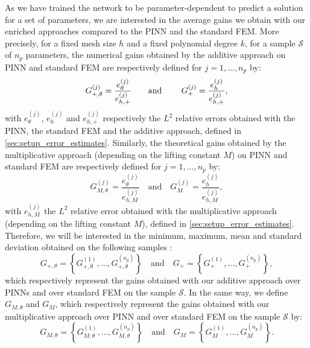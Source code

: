 As we have trained the network to be parameter-dependent to predict a solution for a set of parameters, we are interested in the average gains we obtain with our enriched approaches compared to the PINN and the standard FEM. More precisely, for a fixed mesh size $h$ and a fixed polynomial degree $k$, for a sample $\mathcal{S}$ of $n_p$ parameters, the numerical gains obtained by the additive approach on PINN and standard FEM are respectively defined for $j=1,\dots,n_p$ by:
\begin{equation}
	G_{+,\theta}^{(j)}=\frac{e_\theta^{(j)}}{e_{h,+}^{(j)}}
    \text{\qquad and \qquad}
    G_+^{(j)}=\frac{e_h^{(j)}}{e_{h,+}^{(j)}}, \label{eq:gain_j}
\end{equation}
with $e_\theta^{(j)}$, $e_h^{(j)}$ and $e_{h,+}^{(j)}$ respectively the $L^2$ relative errors obtained with the PINN, the standard FEM and the additive approach, defined in \cref{sec:setup_error_estimates}.
Similarly, the theoretical gains obtained by the multiplicative approach (depending on the lifting constant $M$) on PINN and standard FEM are respectively defined for $j=1,\dots,n_p$ by:
\begin{equation}
	G_{M,\theta}^{(j)}=\frac{e_\theta^{(j)}}{e_{h,M}^{(j)}} \quad \text{and} \quad G_M^{(j)}=\frac{e_h^{(j)}}{e_{h,M}^{(j)}}, \label{eq:gain_j_mul}
\end{equation}
with $e_{h,M}^{(j)}$ the $L^2$ relative error obtained with the multiplicative approach (depending on the lifting constant $M$), defined in \cref{sec:setup_error_estimates}.
Therefore, we will be interested in the minimum, maximum, mean and standard deviation obtained on the following samples :
\begin{equation}
	G_{+,\theta}=\left\{G_{+,\theta}^{(1)},\dots,G_{+,\theta}^{(n_p)}\right\} \quad \text{and} \quad G_+=\left\{G_+^{(1)},\dots,G_+^{(n_p)}\right\}, \label{eq:gain_add_num}
\end{equation}
which respectively represent the gains obtained with our additive approach over PINNs and over standard FEM on the sample $\mathcal{S}$. In the same way, we define $G_{M,\theta}$ and $G_M$, which respectively represent the gains obtained with our multiplicative approach over PINN and over standard FEM on the sample $\mathcal{S}$ by:
\begin{equation}
	G_{M,\theta}=\left\{G_{M,\theta}^{(1)},\dots,G_{M,\theta}^{(n_p)}\right\} \quad \text{and} \quad G_M=\left\{G_M^{(1)},\dots,G_M^{(n_p)}\right\}. \label{eq:gain_mul_num}
\end{equation}
